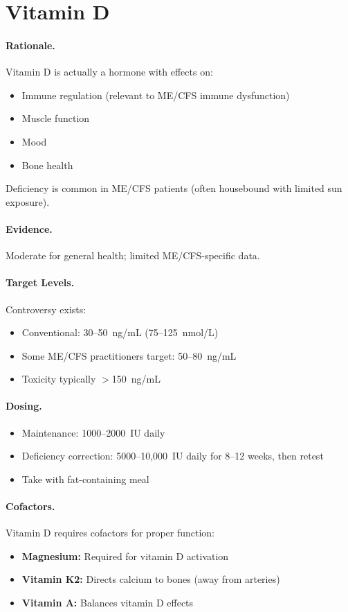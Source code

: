 \section{Vitamin D}
\label{sec:vitamin-d}

\paragraph{Rationale.} Vitamin D is actually a hormone with effects on:
\begin{itemize}
    \item Immune regulation (relevant to ME/CFS immune dysfunction)
    \item Muscle function
    \item Mood
    \item Bone health
\end{itemize}

Deficiency is common in ME/CFS patients (often housebound with limited sun exposure).

\paragraph{Evidence.} Moderate for general health; limited ME/CFS-specific data.

\paragraph{Target Levels.} Controversy exists:
\begin{itemize}
    \item Conventional: 30--50~ng/mL (75--125~nmol/L)
    \item Some ME/CFS practitioners target: 50--80~ng/mL
    \item Toxicity typically $>$150~ng/mL
\end{itemize}

\paragraph{Dosing.}
\begin{itemize}
    \item Maintenance: 1000--2000~IU daily
    \item Deficiency correction: 5000--10,000~IU daily for 8--12 weeks, then retest
    \item Take with fat-containing meal
\end{itemize}

\paragraph{Cofactors.} Vitamin D requires cofactors for proper function:
\begin{itemize}
    \item \textbf{Magnesium:} Required for vitamin D activation
    \item \textbf{Vitamin K2:} Directs calcium to bones (away from arteries)
    \item \textbf{Vitamin A:} Balances vitamin D effects
\end{itemize}

